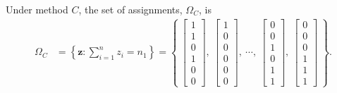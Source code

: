 \documentclass[
  12pt,
  leqno]{article}
\DeclareMathOperator{\1}{\mathbbm{1}}
\begin{document}
Under method \(C\), the set of assignments, \(\Omega_C\), is
\begin{align*}
\Omega_{C} & = \left\{ \mathbf{z}: \sum \limits_{i = 1}^n z_i = n_1 \right\} = \left\{ \ \begin{bmatrix} 1 \\ 1 \\ 0 \\ 1 \\ 0 \\ 0 \end{bmatrix}, \ \begin{bmatrix} 1 \\ 0 \\ 0 \\ 0 \\ 0 \\ 0 \end{bmatrix}, \ \cdots , \ \begin{bmatrix} 0 \\ 0 \\ 1 \\ 0 \\ 1 \\ 1  \end{bmatrix}, \ \begin{bmatrix} 0 \\ 0 \\ 0 \\ 1 \\ 1 \\ 1  \end{bmatrix} \ \right\}.
\end{align*}
\end{document}
